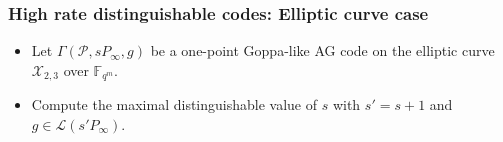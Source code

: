 \documentclass[
10pt, %
%
aspectratio=169, %
]{beamer}
\theoremstyle{plain}%
\theoremstyle{definition}
\theoremstyle{remark}
\newcommand{\calP}{\mathcal{P}}
\newcommand{\calL}{\mathcal{L}}
\newcommand{\calX}{\mathcal{X}}
\newcommand{\fqm}{\mathbb{F}_{q^m}}
\begin{document}
\begin{frame}
	\frametitle{High rate distinguishable codes: Elliptic curve case }
	
	\begin{itemize}
		\item Let $\Gamma(\calP,sP_\infty,g)$ be a one-point Goppa-like AG code on the elliptic curve  $\calX_{2,3}$ over $\fqm$.
		\item Compute the maximal distinguishable value of $s$ with $s'=s+1$ and $g\in \calL(s'P_{\infty})$.
	\end{itemize}
	
	\begin{table}[h]
		\begin{center}
			\vspace*{0.3em}
			\caption{Largest distinguishable Goppa--like AG code in elliptic case.}
		\end{center}
	\end{table}
	
\end{frame}
\end{document}
